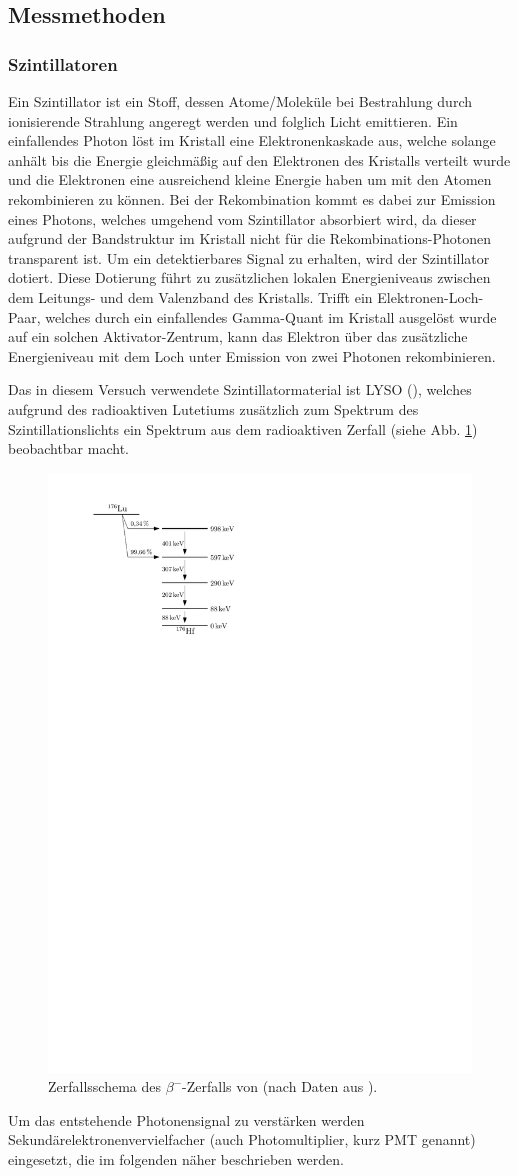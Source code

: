 \documentclass[11pt, a4paper]{article}
\numberwithin{equation}{section}
\begin{document}
\subsection{Messmethoden}

\subsubsection{Szintillatoren}

Ein Szintillator ist ein Stoff, dessen Atome/Moleküle bei Bestrahlung durch ionisierende Strahlung angeregt werden und folglich Licht emittieren.
Ein einfallendes Photon löst im Kristall eine Elektronenkaskade aus, welche solange anhält bis die Energie gleichmäßig auf den Elektronen des Kristalls verteilt wurde und die Elektronen eine ausreichend kleine Energie haben um mit den Atomen rekombinieren zu können.
Bei der Rekombination kommt es dabei zur Emission eines Photons, welches umgehend vom Szintillator absorbiert wird, da dieser aufgrund der Bandstruktur im Kristall nicht für die Rekombinations-Photonen transparent ist.
Um ein detektierbares Signal zu erhalten, wird der Szintillator dotiert.
Diese Dotierung führt zu zusätzlichen lokalen Energieniveaus zwischen dem Leitungs- und dem Valenzband des Kristalls.
Trifft ein Elektronen-Loch-Paar, welches durch ein einfallendes Gamma-Quant im Kristall ausgelöst wurde auf ein solchen Aktivator-Zentrum, kann das Elektron über das zusätzliche Energieniveau mit dem Loch unter Emission von zwei Photonen rekombinieren.

\noindent Das in diesem Versuch verwendete Szintillator\-material ist LYSO (), welches aufgrund des radioaktiven Lute\-tiums zusätzlich zum Spektrum des Szin\-tillations\-lichts ein Spektrum aus dem radioaktiven Zerfall (siehe Abb. \ref{fig:lu_decay_scheme}) beobachtbar macht.
\begin{figure}[htbp]
	\centering
	\includegraphics[width=.5\textwidth]{./figures/lu_decay_scheme}
	\caption{Zerfallsschema des $\beta^-$-Zerfalls von  (nach Daten aus \cite{nuc_datasheet_lu}).}
	\label{fig:lu_decay_scheme}
\end{figure}
Um das entstehende Photonensignal zu verstärken werden Sekundärelektronenvervielfacher (auch Photomultiplier, kurz PMT genannt) eingesetzt, die im folgenden näher beschrieben werden.
\end{document}
